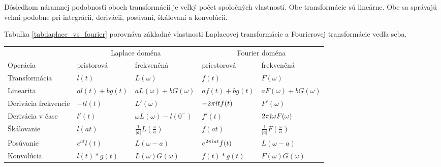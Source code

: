 Dôsledkom náramnej podobnosťi oboch transformácii je veľký počet
spoločných vlastností. Obe transformácie sú lineárne. Obe sa správajú
veľmi podobne pri integrácii, derivácii, posúvaní, škálovaní a
konvolúcii.

Tabuľka \ref{tab:laplace_vs_fourier} porovnáva základné vlastnosti Laplacovej
transformácie a Fourierovej transformácie vedľa seba.

\begin{sidewaystable}[htp]
    \begin{tabular}{l l l l l}
    & \multicolumn{2}{c}{Laplace doména}
    & \multicolumn{2}{c}{Fourier doména} \\
    Operácia & pristorová& frekvenčná&
        priestorová & frekvenčná \\
    Transformácia &
        $l(t)$ & $L(\omega)$ &
        $f(t)$ & $F(\omega)$ \\
    Linearita &
        $a l(t) + b g(t)$ & $a L(\omega) + b G(\omega)$ &
        $a f(t) + b g(t)$ & $a F(\omega) + b G(\omega)$ \\
    Derivácia frekvencie &
        $-t l(t)$ & $L'(\omega)$ &
        $-2\pi\hat{\imath} t f(t) $ & $F'(\omega)$\\
    Derivácia v čase &
        $l'(t)$ & $\omega L(\omega) - l(0^{-})$ &
        $f'(t)$ & $2\pi\hat{\imath}\omega F(\omega)$\\
    Škálovanie &
        $l(at)$ & $\frac{1}{|a|} L(\frac{\omega}{a})$ &
        $f(at)$ & $\frac{1}{|a|} F(\frac{\omega}{a})$\\
    Posúvanie &
        $e^{a t} l(t)$ & $L(\omega -a)$ &
        $e^{2\pi\hat{\imath} at} f(t)$ & $L(\omega - a)$\\
    Konvolúcia &
        $l(t)*g(t)$ & $L(\omega)G(\omega)$ &
        $f(t)*g(t)$ & $F(\omega)G(\omega)$
    \end{tabular}
    \label{tab:laplace_vs_fourier}
    \caption{Porovnanie Laplacovej a Fourierovej transformácie}
\end{sidewaystable}

